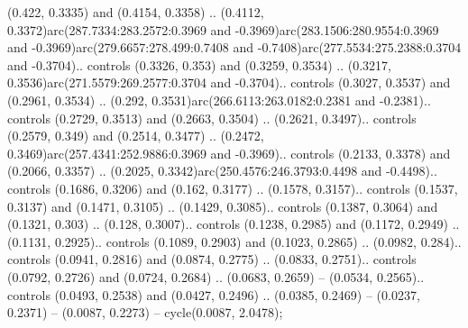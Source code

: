(0.422, 0.3335) and (0.4154, 0.3358) .. (0.4112, 0.3372)arc(287.7334:283.2572:0.3969 and -0.3969)arc(283.1506:280.9554:0.3969 and -0.3969)arc(279.6657:278.499:0.7408 and -0.7408)arc(277.5534:275.2388:0.3704 and -0.3704).. controls (0.3326, 0.353) and (0.3259, 0.3534) .. (0.3217, 0.3536)arc(271.5579:269.2577:0.3704 and -0.3704).. controls (0.3027, 0.3537) and (0.2961, 0.3534) .. (0.292, 0.3531)arc(266.6113:263.0182:0.2381 and -0.2381).. controls (0.2729, 0.3513) and (0.2663, 0.3504) .. (0.2621, 0.3497).. controls (0.2579, 0.349) and (0.2514, 0.3477) .. (0.2472, 0.3469)arc(257.4341:252.9886:0.3969 and -0.3969).. controls (0.2133, 0.3378) and (0.2066, 0.3357) .. (0.2025, 0.3342)arc(250.4576:246.3793:0.4498 and -0.4498).. controls (0.1686, 0.3206) and (0.162, 0.3177) .. (0.1578, 0.3157).. controls (0.1537, 0.3137) and (0.1471, 0.3105) .. (0.1429, 0.3085).. controls (0.1387, 0.3064) and (0.1321, 0.303) .. (0.128, 0.3007).. controls (0.1238, 0.2985) and (0.1172, 0.2949) .. (0.1131, 0.2925).. controls (0.1089, 0.2903) and (0.1023, 0.2865) .. (0.0982, 0.284).. controls (0.0941, 0.2816) and (0.0874, 0.2775) .. (0.0833, 0.2751).. controls (0.0792, 0.2726) and (0.0724, 0.2684) .. (0.0683, 0.2659) -- (0.0534, 0.2565).. controls (0.0493, 0.2538) and (0.0427, 0.2496) .. (0.0385, 0.2469) -- (0.0237, 0.2371) -- (0.0087, 0.2273) -- cycle(0.0087, 2.0478);



